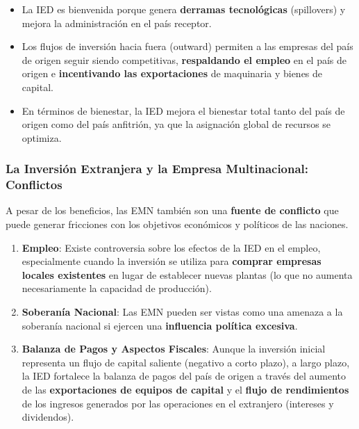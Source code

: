 \begin{itemize}
    \item La IED es bienvenida porque genera \textbf{derramas tecnológicas} (spillovers) y mejora la administración en el país receptor.
    \item Los flujos de inversión hacia fuera (outward) permiten a las empresas del país de origen seguir siendo competitivas, \textbf{respaldando el empleo} en el país de origen e \textbf{incentivando las exportaciones} de maquinaria y bienes de capital.
    \item En términos de bienestar, la IED mejora el bienestar total tanto del país de origen como del país anfitrión, ya que la asignación global de recursos se optimiza.
\end{itemize}

\subsubsection{La Inversión Extranjera y la Empresa Multinacional: Conflictos}
A pesar de los beneficios, las EMN también son una \textbf{fuente de conflicto} que puede generar fricciones con los objetivos económicos y políticos de las naciones.

\begin{enumerate}
    \item \textbf{Empleo}: Existe controversia sobre los efectos de la IED en el empleo, especialmente cuando la inversión se utiliza para \textbf{comprar empresas locales existentes} en lugar de establecer nuevas plantas (lo que no aumenta necesariamente la capacidad de producción).
    \item \textbf{Soberanía Nacional}: Las EMN pueden ser vistas como una amenaza a la soberanía nacional si ejercen una \textbf{influencia política excesiva}.
    \item \textbf{Balanza de Pagos y Aspectos Fiscales}: Aunque la inversión inicial representa un flujo de capital saliente (negativo a corto plazo), a largo plazo, la IED fortalece la balanza de pagos del país de origen a través del aumento de las \textbf{exportaciones de equipos de capital} y el \textbf{flujo de rendimientos} de los ingresos generados por las operaciones en el extranjero (intereses y dividendos).
\end{enumerate}